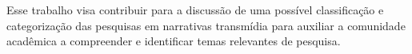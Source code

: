 \documentclass[
article,			%
11pt,				%
oneside,			%
a4paper,			%
english,			%
brazil,				%
sumario=tradicional
]{abntex2}
\begin{document}
  Esse trabalho visa contribuir para a discussão de uma possível classificação e categorização das pesquisas em narrativas transmídia para auxiliar a comunidade acadêmica a compreender e identificar temas relevantes de pesquisa.


  \postextual

  
\end{document}
